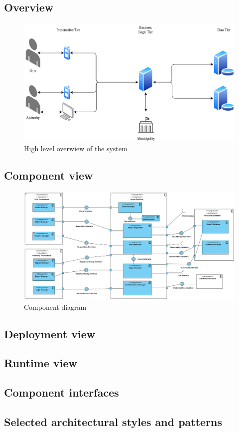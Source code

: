 \subsection{Overview}
\begin{figure}[H]
\includegraphics[width=\textwidth]{Images/SystemOverview.png}
\caption{\label{fig:SystemOverview}High level overwiew of the system}
\end{figure}
\newpage
\subsection{Component view}
\begin{figure}[H]
\includegraphics[width=\textwidth]{Images/ComponentView.png}
\caption{\label{fig:ComponentView}Component diagram}
\end{figure}
\subsection{Deployment view}

\subsection{Runtime view}

\subsection{Component interfaces}

\subsection{Selected architectural styles and patterns}